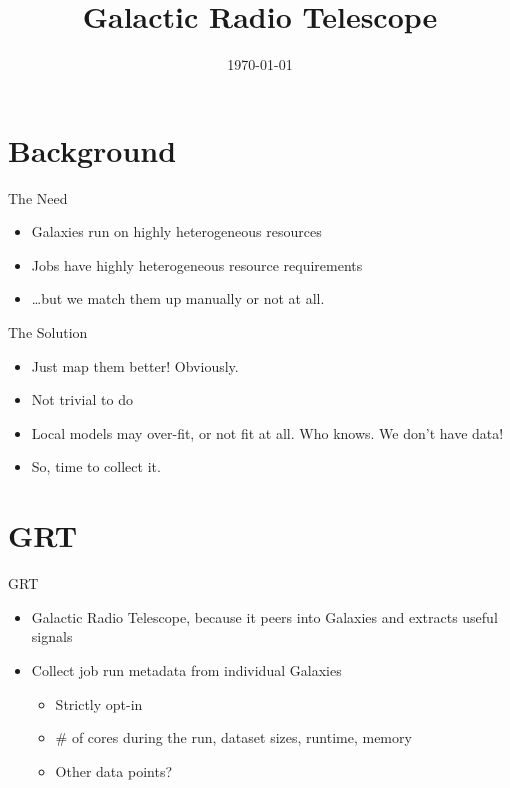 \documentclass[12pt]{beamer}
\title[GRT]{Galactic Radio Telescope}
\author[\myName\\ \color{gray} \myGpgFingerprint]{\myName}
\date{\today}
\begin{document}
\frame{\titlepage}

\section{Background}
\begin{frame}{The Need}
    \begin{itemize}
        \item Galaxies run on highly heterogeneous resources
        \item Jobs have highly heterogeneous resource requirements
        \item \ldots{}but we match them up manually or not at all.
    \end{itemize}
\end{frame}

\begin{frame}{The Solution}
    \begin{itemize}
        \item Just map them better! Obviously.
        \item Not trivial to do
        \item Local models may over-fit, or not fit at all. Who knows. We don't have data!
        \item So, time to collect it.
    \end{itemize}
\end{frame}

\section{GRT}
\begin{frame}{GRT}
    \begin{itemize}
        \item Galactic Radio Telescope, because it peers into Galaxies and extracts useful signals
        \item Collect job run metadata from individual Galaxies
        \begin{itemize}
            \item Strictly opt-in
            \item \# of cores during the run, dataset sizes, runtime, memory
            \item Other data points?
        \end{itemize}
    \end{itemize}
\end{frame}
\end{document}
